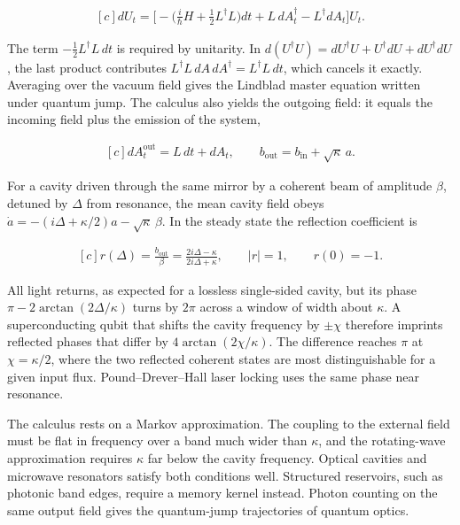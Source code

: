 \documentclass[11pt,oneside]{book}
\newenvironment{centeredalign}{\[\begin{gathered}[c]}{\end{gathered}\]}
\begin{document}
\begin{centeredalign}
dU_t=\Big[-\Big(\frac{i}{\hbar}H+\frac12L^\dagger L\Big)dt
+L\,dA_t^\dagger-L^\dagger dA_t\Big]U_t.
\end{centeredalign}

The term \(-\frac12L^\dagger L\,dt\) is required by unitarity. In \(d(U^\dagger U)=dU^\dagger U+U^\dagger dU+dU^\dagger dU\), the last product contributes \(L^\dagger L\,dA\,dA^\dagger=L^\dagger L\,dt\), which cancels it exactly. Averaging over the vacuum field gives the Lindblad master equation written under quantum jump. The calculus also yields the outgoing field: it equals the incoming field plus the emission of the system,

\begin{centeredalign}
dA^{\mathrm{out}}_t=L\,dt+dA_t,\qquad
b_{\mathrm{out}}=b_{\mathrm{in}}+\sqrt\kappa\,a.
\end{centeredalign}

For a cavity driven through the same mirror by a coherent beam of amplitude \(\beta\), detuned by \(\Delta\) from resonance, the mean cavity field obeys \(\dot a=-(i\Delta+\kappa/2)a-\sqrt\kappa\,\beta\). In the steady state the reflection coefficient is

\begin{centeredalign}
r(\Delta)=\frac{b_{\mathrm{out}}}{\beta}=\frac{2i\Delta-\kappa}{2i\Delta+\kappa},\qquad
|r|=1,\qquad r(0)=-1.
\end{centeredalign}

All light returns, as expected for a lossless single-sided cavity, but its phase \(\pi-2\arctan(2\Delta/\kappa)\) turns by \(2\pi\) across a window of width about \(\kappa\). A superconducting qubit that shifts the cavity frequency by \(\pm\chi\) therefore imprints reflected phases that differ by \(4\arctan(2\chi/\kappa)\). The difference reaches \(\pi\) at \(\chi=\kappa/2\), where the two reflected coherent states are most distinguishable for a given input flux. Pound--Drever--Hall laser locking uses the same phase near resonance.

The calculus rests on a Markov approximation. The coupling to the external field must be flat in frequency over a band much wider than \(\kappa\), and the rotating-wave approximation requires \(\kappa\) far below the cavity frequency. Optical cavities and microwave resonators satisfy both conditions well. Structured reservoirs, such as photonic band edges, require a memory kernel instead. Photon counting on the same output field gives the quantum-jump trajectories of quantum optics.
\end{document}
